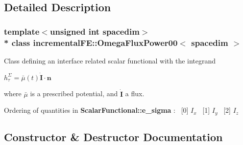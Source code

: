 \subsection{Detailed Description}
\subsubsection*{template$<$unsigned int spacedim$>$\\*
class incremental\+F\+E\+::\+Omega\+Flux\+Power00$<$ spacedim $>$}

Class defining an interface related scalar functional with the integrand

$ h^\Sigma_\tau = \bar\mu(t) \dot{\boldsymbol{I}} \cdot \boldsymbol{n} $

where $\bar\mu$ is a prescribed potential, and $\dot{\boldsymbol{I}}$ a flux.

Ordering of quantities in {\bf Scalar\+Functional\+::e\+\_\+sigma} \+:~\newline
\mbox{[}0\mbox{]} $I_x$~\newline
 \mbox{[}1\mbox{]} $I_y$~\newline
 \mbox{[}2\mbox{]} $I_z$~\newline
 

\subsection{Constructor \& Destructor Documentation}

